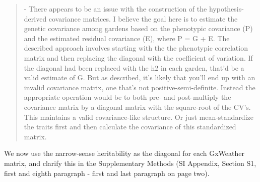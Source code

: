 \documentclass[
  letterpaper,
  DIV=11,
  numbers=noendperiod]{scrartcl}
\begin{document}
\begin{quote}
\begin{tcolorbox}[enhanced jigsaw, colframe=quarto-callout-warning-color-frame, rightrule=.15mm, leftrule=.75mm, left=2mm, breakable, toprule=.15mm, arc=.35mm, bottomrule=.15mm, opacityback=0, colback=white]

- There appears to be an issue with the construction of the
hypothesis-derived covariance matrices. I believe the goal here is to
estimate the genetic covariance among gardens based on the phenotypic
covariance (P) and the estimated residual covariance (E), where P = G +
E. The described approach involves starting with the the phenotypic
correlation matrix and then replacing the diagonal with the coefficient
of variation. If the diagonal had been replaced with the h2 in each
garden, that'd be a valid estimate of G. But as described, it's likely
that you'll end up with an invalid covariance matrix, one that's not
positive-semi-definite. Instead the appropriate operation would be to
both pre- and post-multiply the covariance matrix by a diagonal matrix
with the square-root of the CV's. This maintains a valid covariance-like
structure. Or just mean-standardize the traits first and then calculate
the covariance of this standardized matrix.

\end{tcolorbox}
\end{quote}

We now use the narrow-sense heritability as the diagonal for each
GxWeather matrix, and clarify this in the Supplementary Methods (SI
Appendix, Section S1, first and eighth paragraph - first and last
paragraph on page two).
\end{document}
